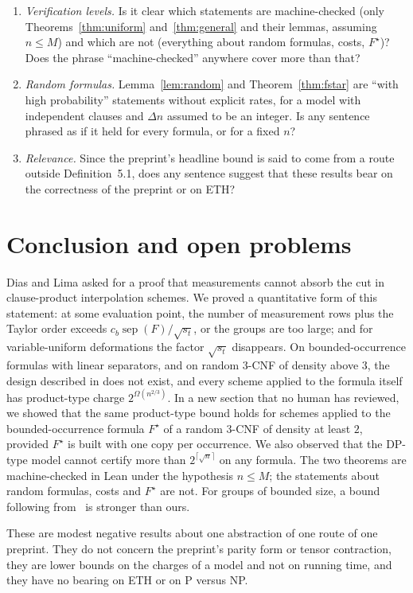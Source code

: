 \documentclass[11pt,a4paper]{article}
\theoremstyle{definition}
\theoremstyle{remark}
\newcommand{\sep}{\operatorname{sep}}
\begin{document}
\begin{enumerate}
\item \emph{Verification levels.} Is it clear which statements are machine-checked (only
 Theorems~\ref{thm:uniform} and~\ref{thm:general} and their lemmas, assuming $n\le M$) and
 which are not (everything about random formulas, costs, $F^\star$)? Does the phrase
 ``machine-checked'' anywhere cover more than that?
\item \emph{Random formulas.} Lemma~\ref{lem:random} and Theorem~\ref{thm:fstar} are ``with
 high probability'' statements without explicit rates, for a model with independent
 clauses and $\Delta n$ assumed to be an integer. Is any sentence phrased as if it held for
 every formula, or for a fixed $n$?
\item \emph{Relevance.} Since the preprint's headline bound is said to come from a route
 outside Definition~5.1, does any sentence suggest that these results bear on the
 correctness of the preprint or on ETH?
\end{enumerate}

\section{Conclusion and open problems}\label{sec:concl}

Dias and Lima asked for a proof that measurements cannot absorb the cut in clause-product
interpolation schemes. We proved a quantitative form of this statement: at some evaluation
point, the number of measurement rows plus the Taylor order exceeds
$c_b\sep(F)/\sqrt{s_t}$, or the groups are too large; and for variable-uniform deformations
the factor $\sqrt{s_t}$ disappears. On bounded-occurrence formulas with linear separators,
and on random 3-CNF of density above $3$, the design described in \cite[Section~9]{DL} does
not exist, and every scheme applied to the formula itself has product-type charge
$2^{\Omega(n^{2/3})}$. In a new section that no human has reviewed, we showed that the same
product-type bound holds for schemes applied to the bounded-occurrence formula $F^\star$ of
a random 3-CNF of density at least $2$, provided $F^\star$ is built with one copy per
occurrence. We also observed that the DP-type model cannot certify more than
$2^{\lceil\sqrt n\rceil}$ on any formula. The two theorems are machine-checked in Lean under
the hypothesis $n\le M$; the statements about random formulas, costs and $F^\star$ are not.
For groups of bounded size, a bound following from~\cite{DL} is stronger than ours.

These are modest negative results about one abstraction of one route of one preprint. They
do not concern the preprint's parity form or tensor contraction, they are lower bounds on
the charges of a model and not on running time, and they have no bearing on ETH or on
P versus NP.
\end{document}
